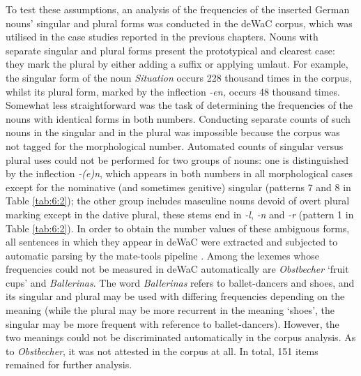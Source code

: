 To test these assumptions, an analysis of the frequencies of the inserted German nouns’ singular and plural forms was conducted in the deWaC corpus, which was utilised in the case studies reported in the previous chapters. Nouns with separate singular and plural forms present the prototypical and clearest case: they mark the plural by either adding a suffix or applying umlaut. For example, the singular form of the noun \textit{Situation} occurs 228 thousand times in the corpus, whilst its plural form, marked by the inflection \textit{-en,} occurs 48 thousand times. Somewhat less straightforward was the task of determining the frequencies of the nouns with identical forms in both numbers. Conducting separate counts of such nouns in the singular and in the plural was impossible because the corpus was not tagged for the morphological number. Automated counts of singular versus plural uses could not be performed for two groups of nouns: one is distinguished by the inflection \textit{-(e)n}, which appears in both numbers in all morphological cases except for the nominative (and sometimes genitive) singular (patterns 7 and 8 in Table \ref{tab:6:2}); the other group includes masculine nouns devoid of overt plural marking except in the dative plural, these stems end in \textit{-l}, \textit{-n} and \textit{-r} (pattern 1 in Table \ref{tab:6:2}). In order to obtain the number values of these ambiguous forms, all sentences in which they appear in deWaC were extracted and subjected to automatic parsing by the mate-tools pipeline \citep{bjorkelund-etal10}. Among the lexemes whose frequencies could not be measured in deWaC automatically are \textit{Obstbecher} `fruit cups' and \textit{Ballerinas}. The word \textit{Ballerinas} refers to ballet-dancers and shoes, and its singular and plural may be used with differing frequencies depending on the meaning (while the plural may be more recurrent in the meaning ‘shoes’, the singular may be more frequent with reference to ballet-dancers). However, the two meanings could not be discriminated automatically in the corpus analysis. As to \textit{Obstbecher}, it was not attested in the corpus at all. In total, 151 items remained for further analysis.

